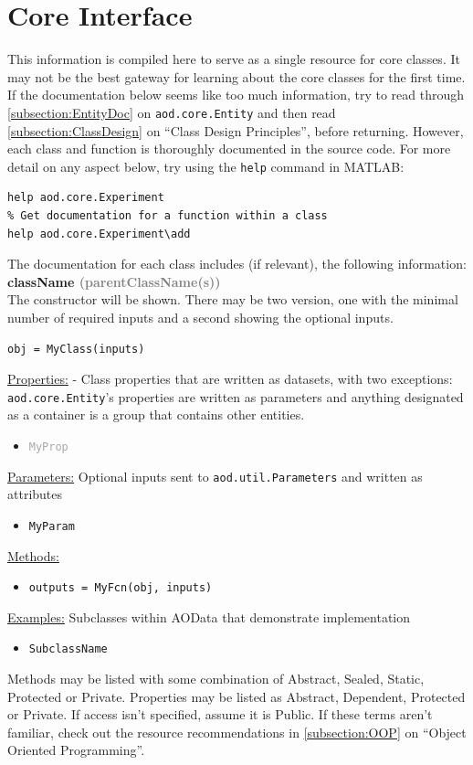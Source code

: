 \documentclass[10pt]{exam}
\newcommand\myurl[1]{\textcolor{blue}{\underline{#1}}}
\newcommand\myparent[1]{\textcolor{gray}{(#1)}}
\newcommand\aodparam[1]{\textcolor{codepurple}{\texttt{#1}}}
\newcommand\aodclass[1]{\textcolor{codeblue}{\texttt{#1}}}
\newcommand\aodprop[1]{\textcolor{darkgray}{\texttt{#1}}}
\newcommand\aodfcn[1]{\textcolor{darkteal}{\texttt{#1}}}
\newcommand\matfcn[1]{\textcolor{darkteal}{\texttt{#1}}}
\newcommand\docheader[1]{\vspace{0.6ex}\noindent\underline{#1}\vspace{0.15ex}}
\begin{document}
\section{Core Interface}
	\label{section:CoreInterface}
	\noindent This information is compiled here to serve as a single resource for core classes. It may not be the best gateway for learning about the core classes for the first time. If the documentation below seems like too much information, try to read through \myurl{\ref{subsection:EntityDoc}} on \aodclass{aod.core.Entity} and then read \myurl{\ref{subsection:ClassDesign}} on ``Class Design Principles'', before returning.  However, each class and function is thoroughly documented in the source code. For more detail on any aspect below, try using the \matfcn{help} command in MATLAB:
	\begin{lstlisting}[style=matlab-editor, basicstyle=\mlttfamily\footnotesize]
% Get documentation for a class or function
help aod.core.Experiment
% Get documentation for a function within a class
help aod.core.Experiment\add
	\end{lstlisting}
	\noindent The documentation for each class includes (if relevant), the following information:\smallskip\\
	\textbf{className \myparent{parentClassName(s)}}\smallskip\\
	The constructor will be shown. There may be two version, one with the minimal number of required inputs and a second showing the optional inputs.
	\begin{lstlisting}[style=matlab-editor, basicstyle=\mlttfamily\footnotesize]
obj = MyClass(inputs)
	\end{lstlisting}
	\docheader{Properties:} - Class properties that are written as datasets, with two exceptions: \aodclass{aod.core.Entity}'s properties are written as parameters and anything designated as a container is a group that contains other entities. %
	\begin{itemize}
		\item \aodprop{MyProp}
	\end{itemize}
	\docheader{Parameters:} Optional inputs sent to \aodclass{aod.util.Parameters} and written as attributes
	\begin{itemize}
		\item \aodparam{MyParam}
	\end{itemize}
	\docheader{Methods:}
	\begin{itemize}
		\item \aodfcn{outputs = MyFcn(obj, inputs)}
	\end{itemize}
	\docheader{Examples:} Subclasses within AOData that demonstrate implementation
	\begin{itemize}
		\item \aodclass{SubclassName}
	\end{itemize}
	\noindent Methods may be listed with some combination of Abstract, Sealed, Static, Protected or Private. Properties may be listed as Abstract, Dependent, Protected or Private. If access isn't specified, assume it is Public. If these terms aren't familiar, check out the resource recommendations in \myurl{\ref{subsection:OOP}} on ``Object Oriented Programming''.
\end{document}
